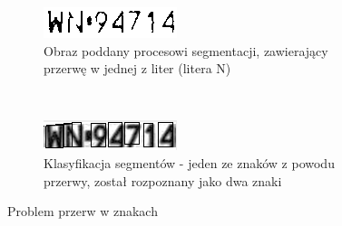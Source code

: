 \begin{figure}
  \centering
  \begin{subfigure}[b]{0.45\textwidth}
    \includegraphics[width=\textwidth]{img/result-przerwa-bad}
    \caption{Obraz poddany procesowi segmentacji, zawierający przerwę w jednej z liter (litera N)}
    \label{fig:result_euro_input}
  \end{subfigure}
  ~
  \begin{subfigure}[b]{0.45\textwidth}
    \includegraphics[width=\textwidth]{img/result-przerwa-output}
    \caption{Klasyfikacja segmentów - jeden ze znaków z powodu przerwy, został rozpoznany jako dwa znaki}
    \label{fig:result_euro_bad}
  \end{subfigure}
  \caption{Problem przerw w znakach }
  \label{fig:result_przerwa}
\end{figure}
